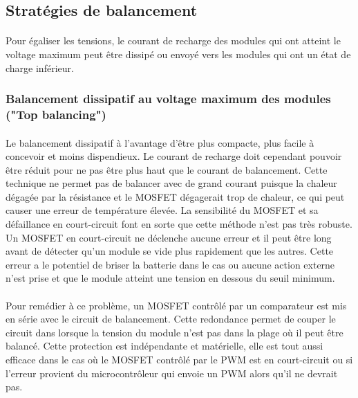 \subsection*{Stratégies de balancement}
\paragraph*{}
Pour égaliser les tensions, le courant de recharge des modules qui ont atteint le voltage maximum peut être dissipé ou envoyé vers les modules qui ont un état de charge inférieur. 

\subsubsection*{Balancement dissipatif au voltage maximum des modules ("Top balancing")}
\paragraph*{}
Le balancement dissipatif à l'avantage d'être plus compacte, plus facile à concevoir et moins dispendieux. Le courant de recharge doit cependant pouvoir être réduit pour ne pas être plus haut que le courant de balancement. Cette technique ne permet pas de balancer avec de grand courant puisque la chaleur dégagée par la résistance et le MOSFET dégagerait trop de chaleur, ce qui peut causer une erreur de température élevée. La sensibilité du MOSFET et sa défaillance en court-circuit  font en sorte que cette méthode n'est pas très robuste. Un MOSFET en court-circuit ne déclenche aucune erreur et il peut être long avant de détecter qu'un module se vide plus rapidement que les autres. Cette erreur a le potentiel de briser la batterie dans le cas ou aucune action externe n'est prise et que le module atteint une tension en dessous du seuil minimum.

\paragraph*{}
Pour remédier à ce problème, un MOSFET contrôlé par un comparateur est mis en série avec le circuit de balancement. Cette redondance permet de couper le circuit dans lorsque la tension du module n'est pas dans la plage où il peut être balancé. Cette protection est indépendante et matérielle, elle est tout aussi efficace dans le cas où le MOSFET contrôlé par le PWM est en court-circuit ou si l'erreur provient du microcontrôleur qui envoie un PWM alors qu'il ne devrait pas.

